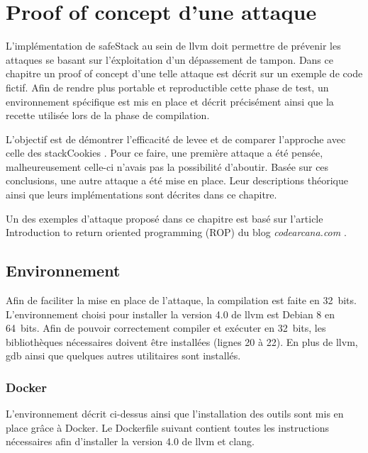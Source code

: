 \chapter{Proof of concept d'une attaque}
\label{chap:attaque}

L'implémentation de \og \gls{safeStack} \fg au sein de \gls{llvm} doit permettre de prévenir les attaques se basant sur l'éxploitation d'un dépassement de tampon. Dans ce chapitre un \og proof of concept \fg d'une telle attaque est décrit sur un exemple de code fictif. Afin de rendre plus portable et reproductible cette phase de test, un environnement spécifique est mis en place et décrit précisément ainsi que la recette utilisée lors de la phase de compilation.

L'objectif est de démontrer l'efficacité de \gls{levee} et de comparer l'approche avec celle des \og \gls{stackCookies} \fg. Pour ce faire, une première attaque a été pensée, malheureusement celle-ci n'avais pas la possibilité d'aboutir. Basée sur ces conclusions, une autre attaque a été mise en place. Leur descriptions théorique ainsi que leurs implémentations sont décrites dans ce chapitre.

Un des exemples d'attaque proposé dans ce chapitre est basé sur l'article \og Introduction to return oriented programming (ROP) \fg du blog \textit{codearcana.com} \cite{IntroductionToROP}.

\minitoc

\newpage

\section{Environnement}

Afin de faciliter la mise en place de l'attaque, la compilation est faite en 32~bits. L'environnement choisi pour installer la version 4.0 de \gls{llvm} est Debian 8 en 64~bits. Afin de pouvoir correctement compiler et exécuter en 32~bits, les bibliothèques nécessaires doivent être installées (lignes 20 à 22). En plus de \gls{llvm}, \gls{gdb} ainsi que quelques autres utilitaires sont installés.

\subsection{Docker}

L'environnement décrit ci-dessus ainsi que l'installation des outils sont mis en place grâce à Docker. Le Dockerfile suivant contient toutes les instructions nécessaires afin d'installer la version 4.0 de \gls{llvm} et \gls{clang}.

